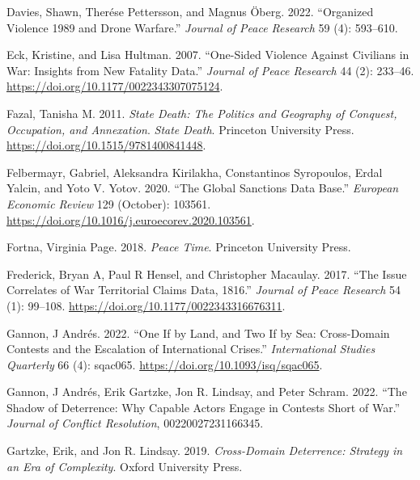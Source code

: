\documentclass{article}
\newlength{\cslhangindent}
\newlength{\cslentryspacingunit} %
\newenvironment{CSLReferences}[2] %
 {%
  \setlength{\parindent}{0pt}
  \ifodd #1
  \let\oldpar\par
  \def\par{\hangindent=\cslhangindent\oldpar}
  \fi
  \setlength{\parskip}{#2\cslentryspacingunit}
 }%
 {}
\begin{document}
\begin{CSLReferences}{1}{0}
\leavevmode{}%
Davies, Shawn, Therése Pettersson, and Magnus Öberg. 2022. {``Organized
Violence 1989 and Drone Warfare.''} \emph{Journal of
Peace Research} 59 (4): 593--610.

\leavevmode{}%
Eck, Kristine, and Lisa Hultman. 2007. {``One-{Sided Violence Against
Civilians} in {War}: {Insights} from {New Fatality Data}.''}
\emph{Journal of Peace Research} 44 (2): 233--46.
\url{https://doi.org/10.1177/0022343307075124}.

\leavevmode{}%
Fazal, Tanisha M. 2011. \emph{State {Death}: {The Politics} and
{Geography} of {Conquest}, {Occupation}, and {Annexation}}. \emph{State
Death}. {Princeton University Press}.
\url{https://doi.org/10.1515/9781400841448}.

\leavevmode{}%
Felbermayr, Gabriel, Aleksandra Kirilakha, Constantinos Syropoulos,
Erdal Yalcin, and Yoto V. Yotov. 2020. {``The Global Sanctions Data
Base.''} \emph{European Economic Review} 129 (October): 103561.
\url{https://doi.org/10.1016/j.euroecorev.2020.103561}.

\leavevmode{}%
Fortna, Virginia Page. 2018. \emph{Peace Time}. {Princeton University
Press}.

\leavevmode{}%
Frederick, Bryan A, Paul R Hensel, and Christopher Macaulay. 2017.
{``The {Issue Correlates} of {War Territorial Claims Data},
1816.''} \emph{Journal of Peace Research} 54 (1):
99--108. \url{https://doi.org/10.1177/0022343316676311}.

\leavevmode{}%
Gannon, J Andrés. 2022. {``One If by {Land}, and {Two} If by {Sea}:
{Cross-Domain Contests} and the {Escalation} of {International
Crises}.''} \emph{International Studies Quarterly} 66 (4): sqac065.
\url{https://doi.org/10.1093/isq/sqac065}.

\leavevmode{}%
Gannon, J Andrés, Erik Gartzke, Jon R. Lindsay, and Peter Schram. 2022.
{``The {Shadow} of {Deterrence}: {Why Capable Actors Engage} in
{Contests Short} of {War}.''} \emph{Journal of Conflict Resolution},
00220027231166345.

\leavevmode{}%
Gartzke, Erik, and Jon R. Lindsay. 2019. \emph{Cross-{Domain
Deterrence}: {Strategy} in an {Era} of {Complexity}}. {Oxford University
Press}.


\end{CSLReferences}
\end{document}
